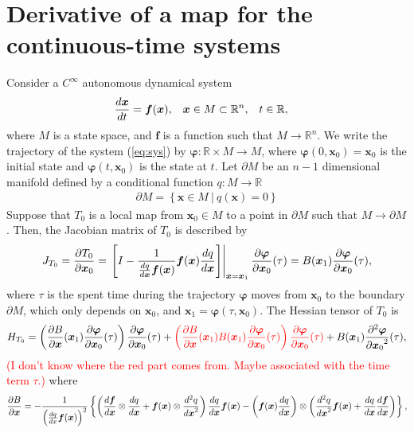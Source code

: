 \documentclass[a4paper]{article}
\newcommand{\R}{\mathbb{R}}
\newcommand{\deriv}[3][1]{%
    \ifthenelse{\equal{#1}{1}}{\frac{d #2}{d #3}}{\frac{d^#1 #2}{{d #3}^#1}}
}
\newcommand{\pderiv}[3][1]{%
    \ifthenelse{\equal{#1}{1}}{\frac{\partial #2}{\partial #3}}{\frac{\partial^#1 #2}{{\partial #3}^#1}}
}
\newcommand{\jac}{J}
\newcommand{\hes}{H}
\newcommand{\parens}[1]{\left(#1\right)}
\newcommand{\braces}[1]{\left\{#1\right\}}
\newcommand{\set}[1]{\braces{#1}}
\newcommand{\parm}{\partial\!M}
\newcommand{\brackets}[1]{\left[#1\right]}
\newcommand{\traj}{\bm \varphi}
\newcommand{\red}[1]{\textcolor{red}{#1}}
\begin{document}
\section{Derivative of a map for the continuous-time systems}
Consider a $C^{\infty}$ autonomous dynamical system
\begin{align}
    \begin{aligned}
        \deriv{\bm x}{t} &= \bm f(\bm x), &
        \bm x &\in M \subset \R^n, &
        t &\in \R,
    \end{aligned}
    \label{eq:sys}
\end{align}
where $M$ is a state space, and $\bm f$ is a function such that $M \to \R^n$.
We write the trajectory of the system (\ref{eq:sys}) by $\traj: \R \times M \to M$,
where $\traj(0, \bm x_0) = \bm x_0$ is the initial state
and $\traj(t, \bm x_0)$ is the state at $t$.
Let $\parm$ be an $n-1$ dimensional manifold defined by
a conditional function $q: M \to \R$
\begin{align}
    \parm = \set{
        \bm x \in M ~|~
        q(\bm x) = 0
    }
\end{align}
Suppose that $T_0$ is a local map from $\bm x_0 \in M$ to a point in $\parm$
such that $M \to \parm$.
Then, the Jacobian matrix of $T_0$ is described by
\begin{align}
    \jac_{T_0} = \pderiv{T_0}{\bm x_0} =
    \left.
    \brackets{
        I -
        \frac{1}{\deriv{q}{\bm x} \bm f(\bm x)}
        \bm f(\bm x) \deriv{q}{\bm x}
    }
    \right|_{\bm x = \bm x_1}
    \pderiv{\traj}{\bm x_0}(\tau)
    =
    B(\bm x_1) \pderiv{\traj}{\bm x_0}(\tau),
\end{align}
where $\tau$ is the spent time during the trajectory $\traj$
moves from $\bm x_0$ to the boundary $\parm$, which only depends on $\bm x_0$,
and $\bm x_1 = \traj(\tau, \bm x_0)$.
The Hessian tensor of $T_0$ is
\begin{align}
    \hes_{T_0}
    =
    \parens{
        \pderiv{B}{\bm x} (\bm x_1) \pderiv{\traj}{\bm x_0}(\tau)
    }
    \pderiv{\traj}{\bm x_0}(\tau)
    +
    \red{\parens{
        \pderiv{B}{\bm x} (\bm x_1) B(\bm x_1) \pderiv{\traj}{\bm x_0}(\tau)
    }
    \pderiv{\traj}{\bm x_0}(\tau)}
    +
    B(\bm x_1) \pderiv[2]{\traj}{\bm x_0}(\tau),
\end{align}
\red{(I don't know where the red part comes from. Maybe associated with the time term $\tau$.)}
where
\begin{align}
    \pderiv{B}{\bm x}
    =
    - \frac{1}{
        \parens{\deriv{q}{x} \bm f(\bm x)}^2
    }
    \braces{
        \parens{
            \deriv{\bm f}{\bm x} \otimes \deriv{q}{\bm x}
            +
            \bm f(\bm x) \otimes \deriv[2]{q}{\bm x}
        }
        \deriv{q}{\bm x} \bm f(\bm x)
        -
        \parens{\bm f(\bm x) \deriv{q}{\bm x}} \otimes
        \parens{
            \deriv[2]{q}{\bm x} \bm f(\bm x)
            +
            \deriv{q}{\bm x} \deriv{\bm f}{\bm x}
        }
    },
\end{align}
\end{document}
